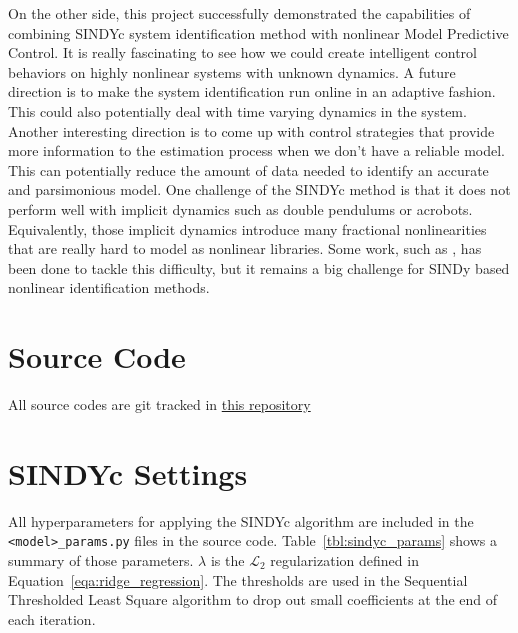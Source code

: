 \documentclass[10pt,twocolumn]{article}
\begin{document}
On the other side, this project successfully demonstrated
the capabilities of combining SINDYc system identification method with nonlinear
Model Predictive Control. It is really fascinating to see how we could create intelligent control
behaviors on highly nonlinear systems with unknown dynamics. A future direction is to make
the system identification run online in an adaptive fashion. This could also potentially deal
with time varying dynamics in the system. Another interesting direction is to come up
with control strategies that provide more information to the estimation process when
we don't have a reliable model. This can potentially reduce the amount of data needed to
identify an accurate and parsimonious model. One challenge of the SINDYc method is that
it does not perform well with implicit dynamics such as double pendulums or acrobots.
Equivalently, those implicit dynamics introduce many fractional nonlinearities that
are really hard to model as nonlinear libraries. Some work, such as \cite{implicitsindy},
has been done to tackle this difficulty, but it remains a big challenge for SINDy based
nonlinear identification methods.

\newpage



\newpage
\onecolumn
\appendix
\appendixpage

\section{Source Code}

All source codes are git tracked in
\href{https://github.com/alvinsunyixiao/ece551-fa20/tree/master/project}{this repository}

\section{SINDYc Settings}\label{sec:hyper_sindy}

All hyperparameters for applying the SINDYc algorithm are included
in the \texttt{<model>\_params.py} files in the source code. Table~\ref{tbl:sindyc_params}
shows a summary of those parameters. $\lambda$ is the $\mathcal{L}_2$ regularization
defined in Equation~\ref{eqa:ridge_regression}. The thresholds are used in the
Sequential Thresholded Least Square algorithm to drop out small coefficients at the end of
each iteration.
\end{document}
